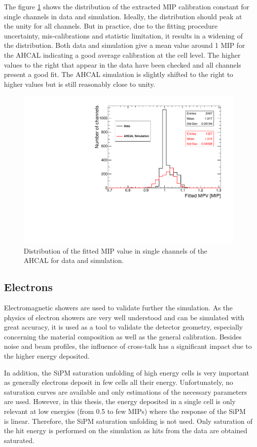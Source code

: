 The figure \ref{fig:MPVData_MC} shows the distribution of the extracted MIP calibration constant for single channels in data and simulation. Ideally, the distribution should peak at the unity for all channels. But in practice, due to the fitting procedure uncertainty, mis-calibrations and statistic limitation, it results in a widening of the distribution. Both data and simulation give a mean value around 1 MIP for the AHCAL indicating a good average calibration at the cell level. The higher values to the right that appear in the data have been checked and all channels present a good fit. The AHCAL simulation is slightly shifted to the right to higher values but is still reasonably close to unity.

\begin{figure}[htbp!]
	\centering
	\includegraphics[width=0.6\linewidth]{../Thesis_Plots/EnergyCalib/Plots/ComparisonMCData_MPV.pdf}
	\caption{Distribution of the fitted MIP value in single channels of the AHCAL for data and simulation.} \label{fig:MPVData_MC}
\end{figure}

\subsection{Electrons}

Electromagnetic showers are used to validate further the simulation. As the physics of electron showers are very well understood and can be simulated with great accuracy, it is used as a tool to validate the detector geometry, especially concerning the material composition as well as the general calibration. Besides noise and beam profiles, the influence of cross-talk has a significant impact due to the higher energy deposited.

In addition, the SiPM saturation unfolding of high energy cells is very important as generally electrons deposit in few cells all their energy. Unfortunately, no saturation curves are available and only estimations of the necessary parameters are used. However, in this thesis, the energy deposited in a single cell is only relevant at low energies (from 0.5 to few MIPs) where the response of the SiPM is linear. Therefore, the SiPM saturation unfolding is not used. Only saturation of the hit energy is performed on the simulation as hits from the data are obtained saturated.

